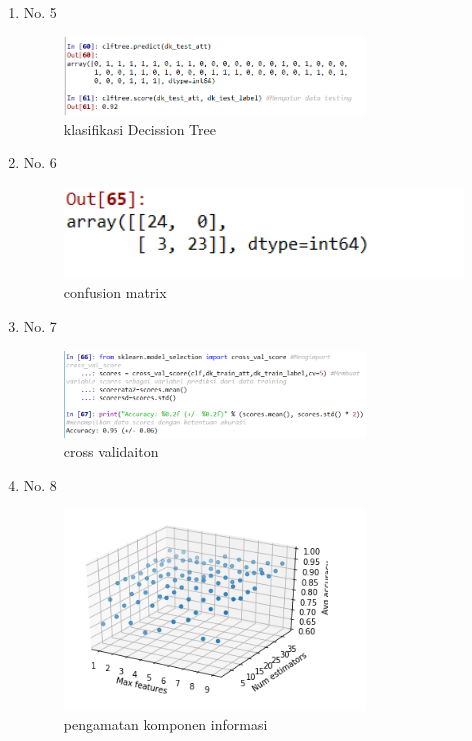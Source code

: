 \begin{enumerate}
\item No. 5
	\hfill\\
	
\begin{figure}[H]
    \includegraphics[width=8cm]{figures/1174084/4/5.png}
    \centering
    \caption{klasiﬁkasi Decission Tree}
\end{figure}

\item No. 6
	\hfill\\
	
\begin{figure}[H]
    \includegraphics[width=12cm]{figures/1174084/4/6.png}
    \centering
    \caption{confusion matrix}
\end{figure}

\item No. 7
	\hfill\\
	
\begin{figure}[H]
    \includegraphics[width=8cm]{figures/1174084/4/7.png}
    \centering
    \caption{cross validaiton}
\end{figure}

\item No. 8
	\hfill\\
	
\begin{figure}[H]
    \includegraphics[width=8cm]{figures/1174084/4/8.png}
    \centering
    \caption{pengamatan komponen informasi}
\end{figure}
\end{enumerate}

